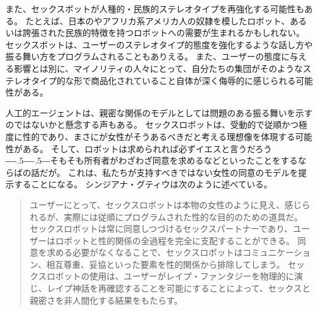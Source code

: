 \documentclass[paper=a4,book,openany]{jlreq}
\def\DDASH{―\kern-.5\zw―\kern-.5\zw―} %
\begin{document}
また、セックスボットが人種的・民族的ステレオタイプを再強化する可能性もある。
たとえば、日本のやアフリカ系アメリカ人の奴隷を模したロボット、あるいは誇張された民族的特徴を持つロボットへの需要が生まれるかもしれない。
セックスボットは、ユーザーのステレオタイプ的態度を強化するような話し方や振る舞い方をプログラムされることもありえる。
また、ユーザーの態度に与える影響とは別に、マイノリティの人々にとって、自分たちの集団がそのようなステレオタイプ的な形で商品化されていること自体が深く侮辱的に感じられる可能性がある。

人工的エージェントは、親密な関係のモデルとしては問題のある振る舞いを示すのではないかと懸念する声もある。
セックスロボットは、受動的で従順かつ極度に性的であり、まさにが女性がそうあるべきだと考える理想像を体現する可能性がある。
そして、ロボットは求められれば必ずイエスと言うだろう{\DDASH}そもそも所有者がわざわざ同意を求めるなどといったことをするならばの話だが。
これは、私たちが支持すべきではない女性の同意のモデルを提示することになる。
シンジアナ・グティウは次のように述べている。

\begin{quote}
 ユーザーにとって、セックスロボットは本物の女性のように見え、感じられるが、実際には従順にプログラムされた性的な目的のための道具だ。
セックスロボットは常に同意しつづけるセックスパートナーであり、ユーザーはロボットと性的関係の全過程を完全に支配することができる。
同意を求める必要がなくなることで、セックスロボットはコミュニケーション、相互尊重、妥協といった要素を性的関係から排除してしまう。
セックスロボットの使用は、ユーザーがレイプ・ファンタジーを物理的に演じ、レイプ神話を再確認することを可能にすることによって、セックスと親密さを非人間化する結果をもたらす。
\citep[p.187]{gutiu16:_robot_consen}
\end{quote}
\end{document}
